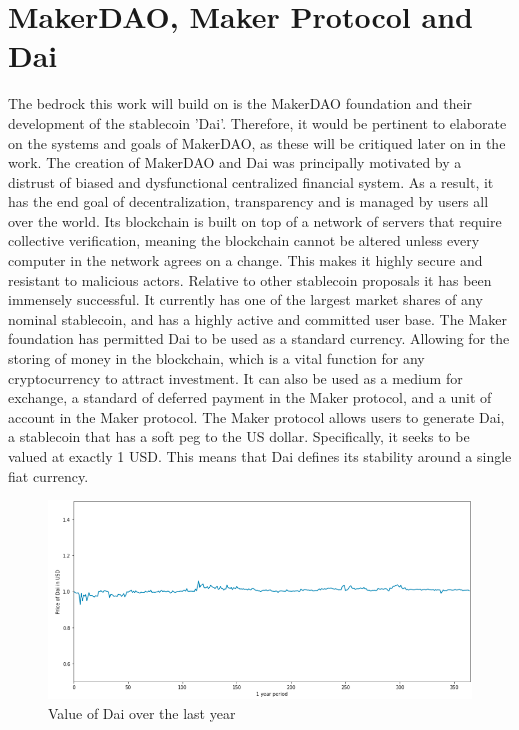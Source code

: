 \documentclass[bsc,frontabs,singlespacing,parskip,deptreport]{infthesis}
\begin{document}
    \section{MakerDAO, Maker Protocol and Dai}
     The bedrock this work will build on is the MakerDAO foundation and their development of the stablecoin 'Dai'. Therefore, it would be pertinent to elaborate on the systems and goals of MakerDAO, as these will be critiqued later on in the work.
    \smallbreak
    \noindent The creation of MakerDAO and Dai was principally motivated by a distrust of biased and dysfunctional centralized financial system. As a result, it has the end goal of decentralization, transparency and is managed by users all over the world. Its blockchain is built on top of a network of servers that require collective verification, meaning the blockchain cannot be altered unless every computer in the network agrees on a change. This makes it highly secure and resistant to malicious actors. Relative to other stablecoin proposals it has been immensely successful. It currently has one of the largest market shares of any nominal stablecoin, and has a highly active and committed user base.
     \smallbreak
     \noindent The Maker foundation has permitted Dai to be used as a standard currency. Allowing for the storing of money in the blockchain, which is a vital function for any cryptocurrency to attract investment. It can also be used as a medium for exchange, a standard of deferred payment in the Maker protocol, and a unit of account in the Maker protocol.  The Maker protocol allows users to generate Dai, a stablecoin that has a soft peg to the US dollar. Specifically, it seeks to be valued at exactly 1 USD. This means that Dai defines its stability around a single fiat currency.
    \smallbreak
    \begin{figure}[h]
            \centering
         \includegraphics[width=\linewidth]{Images and Figures/dai.png}
              \caption{Value of Dai over the last year}
    \end{figure}
\end{document}
